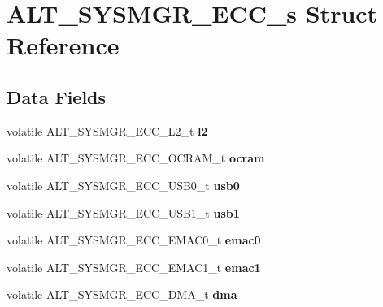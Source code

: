 \hypertarget{structALT__SYSMGR__ECC__s}{}\section{A\+L\+T\+\_\+\+S\+Y\+S\+M\+G\+R\+\_\+\+E\+C\+C\+\_\+s Struct Reference}
\label{structALT__SYSMGR__ECC__s}
\subsection*{Data Fields}
\begin{DoxyCompactItemize}
\item 
\mbox{\label{structALT__SYSMGR__ECC__s_a595028e6b502e97097f4414eb85885db}} 
volatile A\+L\+T\+\_\+\+S\+Y\+S\+M\+G\+R\+\_\+\+E\+C\+C\+\_\+\+L2\+\_\+t {\bfseries l2}
\item 
\mbox{\label{structALT__SYSMGR__ECC__s_a519f74af76798e490d3e22135679b12f}} 
volatile A\+L\+T\+\_\+\+S\+Y\+S\+M\+G\+R\+\_\+\+E\+C\+C\+\_\+\+O\+C\+R\+A\+M\+\_\+t {\bfseries ocram}
\item 
\mbox{\label{structALT__SYSMGR__ECC__s_aea92ccf46b244a764293e5db97c40157}} 
volatile A\+L\+T\+\_\+\+S\+Y\+S\+M\+G\+R\+\_\+\+E\+C\+C\+\_\+\+U\+S\+B0\+\_\+t {\bfseries usb0}
\item 
\mbox{\label{structALT__SYSMGR__ECC__s_ae9b78d276aa7223f9e81fb6c7d86207b}} 
volatile A\+L\+T\+\_\+\+S\+Y\+S\+M\+G\+R\+\_\+\+E\+C\+C\+\_\+\+U\+S\+B1\+\_\+t {\bfseries usb1}
\item 
\mbox{\label{structALT__SYSMGR__ECC__s_a969469a8286a6163c2dc09d6c2b3714a}} 
volatile A\+L\+T\+\_\+\+S\+Y\+S\+M\+G\+R\+\_\+\+E\+C\+C\+\_\+\+E\+M\+A\+C0\+\_\+t {\bfseries emac0}
\item 
\mbox{\label{structALT__SYSMGR__ECC__s_a909a568a5328a3a8d75dc2c9a60c33c6}} 
volatile A\+L\+T\+\_\+\+S\+Y\+S\+M\+G\+R\+\_\+\+E\+C\+C\+\_\+\+E\+M\+A\+C1\+\_\+t {\bfseries emac1}
\item 
\mbox{\label{structALT__SYSMGR__ECC__s_a6cc16060efa43f21816da82177ea6761}} 
volatile A\+L\+T\+\_\+\+S\+Y\+S\+M\+G\+R\+\_\+\+E\+C\+C\+\_\+\+D\+M\+A\+\_\+t {\bfseries dma}

\end{DoxyCompactItemize}
